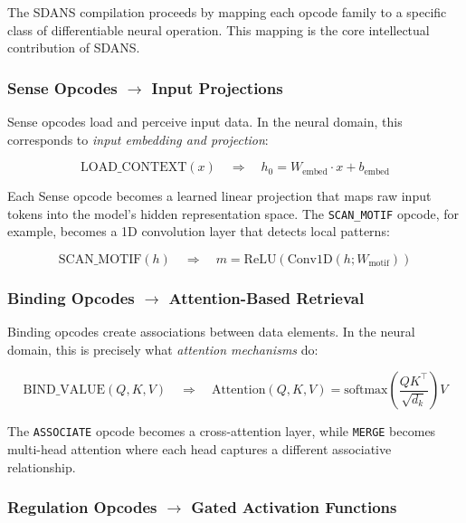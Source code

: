 The SDANS compilation proceeds by mapping each opcode family to a specific class of differentiable neural operation. This mapping is the core intellectual contribution of SDANS.

\subsubsection{Sense Opcodes $\to$ Input Projections}

Sense opcodes load and perceive input data. In the neural domain, this corresponds to \emph{input embedding and projection}:

\begin{equation}
\text{LOAD\_CONTEXT}(x) \quad\Longrightarrow\quad h_0 = W_{\text{embed}} \cdot x + b_{\text{embed}}
\end{equation}

Each Sense opcode becomes a learned linear projection that maps raw input tokens into the model's hidden representation space. The \texttt{SCAN\_MOTIF} opcode, for example, becomes a 1D convolution layer that detects local patterns:

\begin{equation}
\text{SCAN\_MOTIF}(h) \quad\Longrightarrow\quad m = \text{ReLU}(\text{Conv1D}(h; W_{\text{motif}}))
\end{equation}

\subsubsection{Binding Opcodes $\to$ Attention-Based Retrieval}

Binding opcodes create associations between data elements. In the neural domain, this is precisely what \emph{attention mechanisms} do:

\begin{equation}
\text{BIND\_VALUE}(Q, K, V) \quad\Longrightarrow\quad \text{Attention}(Q, K, V) = \text{softmax}\!\left(\frac{QK^\top}{\sqrt{d_k}}\right) V
\end{equation}

The \texttt{ASSOCIATE} opcode becomes a cross-attention layer, while \texttt{MERGE} becomes multi-head attention where each head captures a different associative relationship.

\subsubsection{Regulation Opcodes $\to$ Gated Activation Functions}

